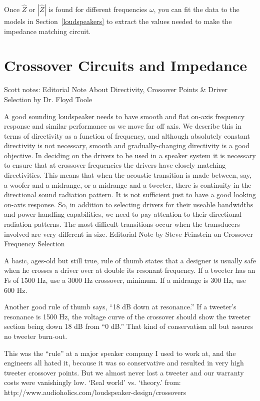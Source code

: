 \documentclass[10pt]{book}
\begin{document}
Once $\hat{Z}$ or $\left| \hat{Z} \right|$ is found for different frequencies $\omega$, you can fit the data to the models in Section~\ref{loudspeakers} to extract the values needed to make the impedance matching circuit.

\section{Crossover Circuits and Impedance}

Scott notes:
Editorial Note About Directivity, Crossover Points \& Driver Selection by Dr. Floyd Toole

A good sounding loudspeaker needs to have smooth and flat on-axis frequency response and similar performance as we move far off axis.  We describe this in terms of directivity as a function of frequency, and although absolutely constant directivity is not necessary, smooth and gradually-changing directivity is a good objective.  In deciding on the drivers to be used in a speaker system it is necessary to ensure that at crossover frequencies the drivers have closely matching directivities.  This means that when the acoustic transition is made between, say, a woofer and a midrange, or a midrange and a tweeter, there is continuity in the directional sound radiation pattern. It is not sufficient just to have a good looking on-axis response.  So, in addition to selecting drivers for their useable bandwidths and power handling capabilities, we need to pay attention to their directional radiation patterns. The most difficult transitions occur when the transducers involved are very different in size.
Editorial Note by Steve Feinstein on Crossover Frequency Selection

A basic, ages-old but still true, rule of thumb states that a designer is usually safe when he crosses a driver over at double its resonant frequency. If a tweeter has an Fs of 1500 Hz, use a 3000 Hz crossover, minimum. If a midrange is 300 Hz, use 600 Hz.

Another good rule of thumb says, “18 dB down at resonance.” If a tweeter’s resonance is 1500 Hz, the voltage curve of the crossover should show the tweeter section being down 18 dB from “0 dB.” That kind of conservatism all but assures no tweeter burn-out.

This was the “rule” at a major speaker company I used to work at, and the engineers all hated it, because it was so conservative and resulted in very high tweeter crossover points. But we almost never lost a tweeter and our warranty costs were vanishingly low. ‘Real world’ vs. ‘theory.’
from:
http://www.audioholics.com/loudspeaker-design/crossovers
\end{document}
